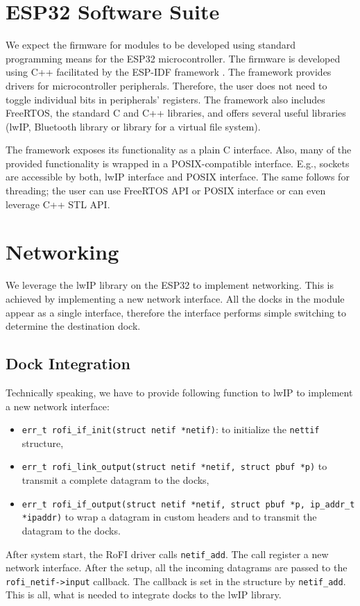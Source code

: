 \section{ESP32 Software Suite} \label{sec:hardware}

We expect the firmware for modules to be developed using standard programming
means for the ESP32 microcontroller. The firmware is developed using C++
facilitated by the ESP-IDF framework \cite{noauthor_esp-idf_nodate}. The
framework provides drivers for microcontroller peripherals. Therefore, the user
does not need to toggle individual bits in peripherals' registers. The framework
also includes FreeRTOS, the standard C and C++ libraries, and offers several
useful libraries (lwIP, Bluetooth library or library for a virtual file
system).

The framework exposes its functionality as a plain C interface. Also, many of
the provided functionality is wrapped in a POSIX-compatible interface. E.g.,
sockets are accessible by both, lwIP interface and POSIX interface. The same
follows for threading; the user can use FreeRTOS API or POSIX interface or can
even leverage C++ STL API.

\section{Networking} \label{sec:networking}

We leverage the lwIP library on the ESP32 to implement networking. This is
achieved by implementing a new network interface. All the docks in the module
appear as a single interface, therefore the interface performs simple switching
to determine the destination dock.

\subsection{Dock Integration}

Technically speaking, we have to provide following function to lwIP to implement
a new network interface:
\begin{itemize}
    \item \texttt{err_t rofi_if_init(struct netif *netif)}:
    to initialize the \texttt{nettif} structure,
    \item \texttt{err_t rofi_link_output(struct netif *netif, struct pbuf *p)}
    to transmit a complete datagram to the docks,
    \item \texttt{err\_t rofi\_if\_output(struct netif *netif, struct pbuf *p, ip\_addr\_t *ipaddr)}
    to wrap a datagram in custom headers and to transmit the datagram to the
    docks.
\end{itemize}
After system start, the RoFI driver calls \texttt{netif\_add}. The call register
a new network interface. After the setup, all the incoming datagrams are passed
to the \texttt{rofi\_netif->input} callback. The callback is set in the
structure by \texttt{netif\_add}. This is all, what is needed to integrate docks
to the lwIP library.

